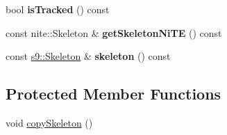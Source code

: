 \begin{DoxyCompactItemize}
\item 
\hypertarget{classs9_1_1oni_1_1OpenNISkeleton_1_1User_ae6ada7f65e6fb3cfaff55cb157df18d9}{bool {\bfseries is\-Tracked} () const }\label{classs9_1_1oni_1_1OpenNISkeleton_1_1User_ae6ada7f65e6fb3cfaff55cb157df18d9}

\item 
\hypertarget{classs9_1_1oni_1_1OpenNISkeleton_1_1User_acc1f564dd8f269bc7875f0dc4eb518b6}{const nite\-::\-Skeleton \& {\bfseries get\-Skeleton\-Ni\-T\-E} () const }\label{classs9_1_1oni_1_1OpenNISkeleton_1_1User_acc1f564dd8f269bc7875f0dc4eb518b6}

\item 
\hypertarget{classs9_1_1oni_1_1OpenNISkeleton_1_1User_a8642ee841863a1a20fc4cba8dd835973}{const \hyperlink{classs9_1_1Skeleton}{s9\-::\-Skeleton} \& {\bfseries skeleton} () const }\label{classs9_1_1oni_1_1OpenNISkeleton_1_1User_a8642ee841863a1a20fc4cba8dd835973}

\end{DoxyCompactItemize}
\subsection*{Protected Member Functions}
\begin{DoxyCompactItemize}
\item 
void \hyperlink{classs9_1_1oni_1_1OpenNISkeleton_1_1User_a9475f7e337cb55fdd051b6b8a577d523}{copy\-Skeleton} ()
\end{DoxyCompactItemize}
